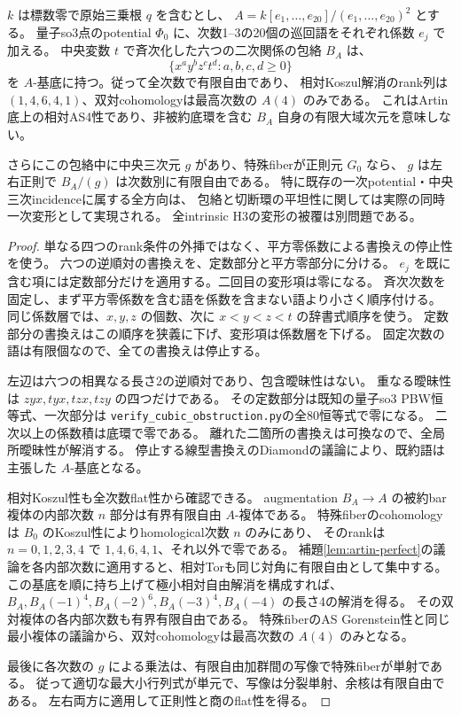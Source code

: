 \begin{proposition}[全20方向の同時一次包絡は全次数で平坦]
\label{prop:square-zero-potential-pbw}
$k$ は標数零で原始三乗根 $q$ を含むとし、
$A=k[e_1,\ldots,e_{20}]/(e_1,\ldots,e_{20})^2$ とする。
量子so3点のpotential $\Phi_0$ に、次数1--3の20個の巡回語をそれぞれ係数 $e_j$ で加える。
中央変数 $t$ で斉次化した六つの二次関係の包絡 $B_A$ は、
\[
 \{x^ay^bz^ct^d:a,b,c,d\ge0\}
\]
を $A$-基底に持つ。従って全次数で有限自由であり、
相対Koszul解消のrank列は $(1,4,6,4,1)$、双対cohomologyは最高次数の $A(4)$ のみである。
これはArtin底上の相対AS4性であり、非被約底環を含む $B_A$ 自身の有限大域次元を意味しない。

さらにこの包絡中に中央三次元 $g$ があり、特殊fiberが正則元 $G_0$ なら、
$g$ は左右正則で $B_A/(g)$ は次数別に有限自由である。
特に既存の一次potential・中央三次incidenceに属する全方向は、
包絡と切断環の平坦性に関しては実際の同時一次変形として実現される。
全intrinsic H3の変形の被覆は別問題である。
\end{proposition}
\begin{proof}
単なる四つのrank条件の外挿ではなく、平方零係数による書換えの停止性を使う。
六つの逆順対の書換えを、定数部分と平方零部分に分ける。
$e_j$ を既に含む項には定数部分だけを適用する。二回目の変形項は零になる。
斉次次数を固定し、まず平方零係数を含む語を係数を含まない語より小さく順序付ける。
同じ係数層では、$x,y,z$ の個数、次に $x<y<z<t$ の辞書式順序を使う。
定数部分の書換えはこの順序を狭義に下げ、変形項は係数層を下げる。
固定次数の語は有限個なので、全ての書換えは停止する。

左辺は六つの相異なる長さ2の逆順対であり、包含曖昧性はない。
重なる曖昧性は $zyx,tyx,tzx,tzy$ の四つだけである。
その定数部分は既知の量子so3 PBW恒等式、一次部分は
\texttt{verify\_cubic\_obstruction.py}の全80恒等式で零になる。
二次以上の係数積は底環で零である。
離れた二箇所の書換えは可換なので、全局所曖昧性が解消する。
停止する線型書換えのDiamondの議論により、既約語は主張した $A$-基底となる。

相対Koszul性も全次数flat性から確認できる。
augmentation $B_A\to A$ の被約bar複体の内部次数 $n$ 部分は有界有限自由 $A$-複体である。
特殊fiberのcohomologyは $B_0$ のKoszul性によりhomological次数 $n$ のみにあり、
そのrankは $n=0,1,2,3,4$ で $1,4,6,4,1$、それ以外で零である。
補題\ref{lem:artin-perfect}の議論を各内部次数に適用すると、相対Torも同じ対角に有限自由として集中する。
この基底を順に持ち上げて極小相対自由解消を構成すれば、
$B_A,B_A(-1)^4,B_A(-2)^6,B_A(-3)^4,B_A(-4)$ の長さ4の解消を得る。
その双対複体の各内部次数も有界有限自由である。
特殊fiberのAS Gorenstein性と同じ最小複体の議論から、双対cohomologyは最高次数の $A(4)$ のみとなる。

最後に各次数の $g$ による乗法は、有限自由加群間の写像で特殊fiberが単射である。
従って適切な最大小行列式が単元で、写像は分裂単射、余核は有限自由である。
左右両方に適用して正則性と商のflat性を得る。
\end{proof}

